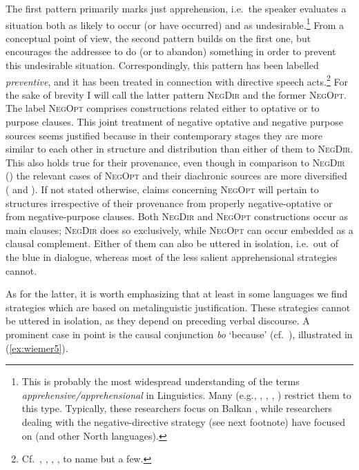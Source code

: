 \documentclass[output=paper,colorlinks,citecolor=brown]{langscibook}
\begin{document}
 The first pattern primarily marks just apprehension, i.e.\ the speaker evaluates a situation both as likely to occur (or have occurred) and as undesirable.\footnote{This is probably the most widespread understanding of the terms \textit{apprehensive/apprehensional} in  Linguistics. Many (e.g., \citealt{Ivanova2014}, \citealt{Mitkovska2015}, \citealt{Bužarovska2017}, \citealt{MitkovskaEtAl2017}) restrict them to this type. Typically, these researchers focus on Balkan , while researchers dealing with the negative-directive strategy (see next footnote) have focused on  (and other North  languages).} From a conceptual point of view, the second pattern builds on the first one, but encourages the addressee to do (or to abandon) something in order to prevent this undesirable situation. Correspondingly, this pattern has been labelled \textit{preventive}, and it has been treated in connection with directive speech acts.\footnote{Cf.\ \citet{Laskowski1998}, \citet{Xrakovskij2001}, \citet{Nilsson2012,Nilsson2013},  \citet{Kissine2014}, to name but a few.} For the sake of brevity I will call the latter pattern \textsc{NegDir} and the former \textsc{NegOpt}. The label \textsc{NegOpt} comprises constructions related either to optative or to purpose clauses. This joint treatment of negative optative and negative purpose sources seems justified because in their contemporary stages they are more similar to each other in structure and distribution than either of them to \textsc{NegDir}. This also holds true for their provenance, even though in comparison to \textsc{NegDir} () the relevant cases of \textsc{NegOpt} and their diachronic sources are more diversified ( and ). If not stated otherwise, claims concerning \textsc{NegOpt} will pertain to structures irrespective of their provenance from properly negative-optative or from negative-purpose clauses. Both \textsc{NegDir} and \textsc{NegOpt} constructions occur as main clauses; \textsc{NegDir} does so exclusively, while \textsc{NegOpt} can occur embedded as a clausal complement. Either of them can also be uttered in isolation, i.e.\ out of the blue in dialogue, whereas most of the less salient apprehensional strategies cannot.


As for the latter, it is worth emphasizing that at least in some  languages we find strategies which are based on metalinguistic justification. These strategies cannot be uttered in isolation, as they depend on preceding verbal discourse. A prominent case in point is the  causal conjunction \textit{bo} `because' (cf.\ \citealt{Kawka1988}), illustrated in (\ref{ex:wiemer5}).
\end{document}
